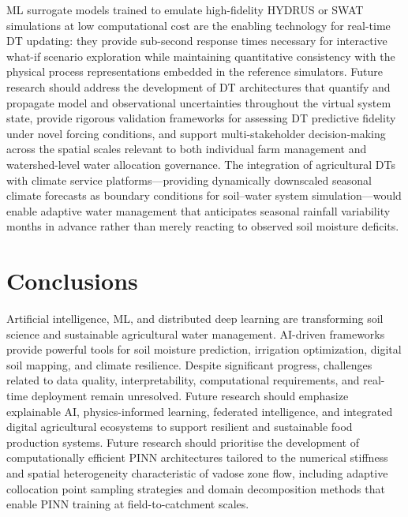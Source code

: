 \documentclass[land,article,submit,pdftex,moreauthors]{Definitions/mdpi}
\numberwithin{equation}{section}
\begin{document}
ML surrogate models trained to emulate high-fidelity HYDRUS or SWAT simulations at low computational cost are the enabling technology for real-time DT updating: they provide sub-second response times necessary for interactive what-if scenario exploration while maintaining quantitative consistency with the physical process representations embedded in the reference simulators. Future research should address the development of DT architectures that quantify and propagate model and observational uncertainties throughout the virtual system state, provide rigorous validation frameworks for assessing DT predictive fidelity under novel forcing conditions, and support multi-stakeholder decision-making across the spatial scales relevant to both individual farm management and watershed-level water allocation governance. The integration of agricultural DTs with climate service platforms---providing dynamically downscaled seasonal climate forecasts as boundary conditions for soil--water system simulation---would enable adaptive water management that anticipates seasonal rainfall variability months in advance rather than merely reacting to observed soil moisture deficits.

\section{Conclusions}
Artificial intelligence, ML, and distributed deep learning are transforming soil science and sustainable agricultural water management. AI-driven frameworks provide powerful tools for soil moisture prediction, irrigation optimization, digital soil mapping, and climate resilience. Despite significant progress, challenges related to data quality, interpretability, computational requirements, and real-time deployment remain unresolved. Future research should emphasize explainable AI, physics-informed learning, federated intelligence, and integrated digital agricultural ecosystems to support resilient and sustainable food production systems. Future research should prioritise the development of computationally efficient PINN architectures tailored to the numerical stiffness and spatial heterogeneity characteristic of vadose zone flow, including adaptive collocation point sampling strategies and domain decomposition methods that enable PINN training at field-to-catchment scales. 


\end{document}
